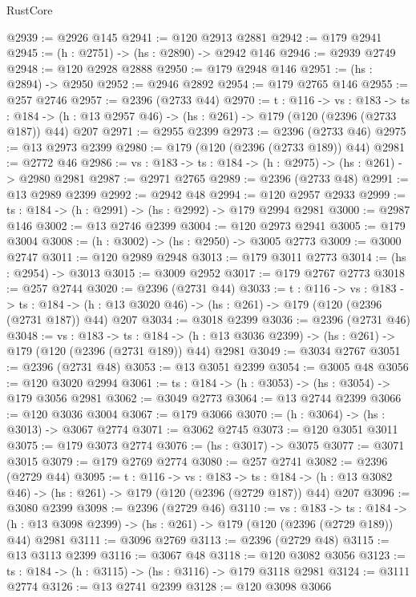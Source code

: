 \begin{lexlean}{RustCore}
\begin{coremodule}
@2939 := @2926 @145
@2941 := @120 @2913 @2881
@2942 := @179 @2941
@2945 := (h : @2751) -> (hs : @2890) -> @2942 @146
@2946 := @2939 @2749
@2948 := @120 @2928 @2888
@2950 := @179 @2948 @146
@2951 := (hs : @2894) -> @2950
@2952 := @2946 @2892
@2954 := @179 @2765 @146
@2955 := @257 @2746
@2957 := @2396 (@2733 @44)
@2970 := {t : @116} ->
  {vs : @183} ->
  {ts : @184} -> (h : @13 @2957 @46) -> (hs : @261) -> @179 (@120 (@2396 (@2733 @187)) @44) @207
@2971 := @2955 @2399
@2973 := @2396 (@2733 @46)
@2975 := @13 @2973 @2399
@2980 := @179 (@120 (@2396 (@2733 @189)) @44)
@2981 := @2772 @46
@2986 := {vs : @183} -> {ts : @184} -> (h : @2975) -> (hs : @261) -> @2980 @2981
@2987 := @2971 @2765
@2989 := @2396 (@2733 @48)
@2991 := @13 @2989 @2399
@2992 := @2942 @48
@2994 := @120 @2957 @2933
@2999 := {ts : @184} -> (h : @2991) -> (hs : @2992) -> @179 @2994 @2981
@3000 := @2987 @146
@3002 := @13 @2746 @2399
@3004 := @120 @2973 @2941
@3005 := @179 @3004
@3008 := (h : @3002) -> (hs : @2950) -> @3005 @2773
@3009 := @3000 @2747
@3011 := @120 @2989 @2948
@3013 := @179 @3011 @2773
@3014 := (hs : @2954) -> @3013
@3015 := @3009 @2952
@3017 := @179 @2767 @2773
@3018 := @257 @2744
@3020 := @2396 (@2731 @44)
@3033 := {t : @116} ->
  {vs : @183} ->
  {ts : @184} -> (h : @13 @3020 @46) -> (hs : @261) -> @179 (@120 (@2396 (@2731 @187)) @44) @207
@3034 := @3018 @2399
@3036 := @2396 (@2731 @46)
@3048 := {vs : @183} ->
  {ts : @184} -> (h : @13 @3036 @2399) -> (hs : @261) -> @179 (@120 (@2396 (@2731 @189)) @44) @2981
@3049 := @3034 @2767
@3051 := @2396 (@2731 @48)
@3053 := @13 @3051 @2399
@3054 := @3005 @48
@3056 := @120 @3020 @2994
@3061 := {ts : @184} -> (h : @3053) -> (hs : @3054) -> @179 @3056 @2981
@3062 := @3049 @2773
@3064 := @13 @2744 @2399
@3066 := @120 @3036 @3004
@3067 := @179 @3066
@3070 := (h : @3064) -> (hs : @3013) -> @3067 @2774
@3071 := @3062 @2745
@3073 := @120 @3051 @3011
@3075 := @179 @3073 @2774
@3076 := (hs : @3017) -> @3075
@3077 := @3071 @3015
@3079 := @179 @2769 @2774
@3080 := @257 @2741
@3082 := @2396 (@2729 @44)
@3095 := {t : @116} ->
  {vs : @183} ->
  {ts : @184} -> (h : @13 @3082 @46) -> (hs : @261) -> @179 (@120 (@2396 (@2729 @187)) @44) @207
@3096 := @3080 @2399
@3098 := @2396 (@2729 @46)
@3110 := {vs : @183} ->
  {ts : @184} -> (h : @13 @3098 @2399) -> (hs : @261) -> @179 (@120 (@2396 (@2729 @189)) @44) @2981
@3111 := @3096 @2769
@3113 := @2396 (@2729 @48)
@3115 := @13 @3113 @2399
@3116 := @3067 @48
@3118 := @120 @3082 @3056
@3123 := {ts : @184} -> (h : @3115) -> (hs : @3116) -> @179 @3118 @2981
@3124 := @3111 @2774
@3126 := @13 @2741 @2399
@3128 := @120 @3098 @3066

\end{coremodule}
\end{lexlean}
